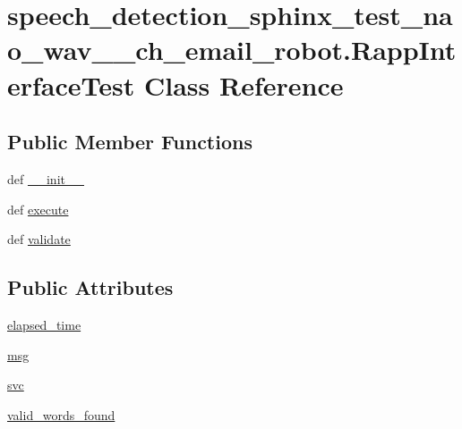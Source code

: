 \hypertarget{classspeech__detection__sphinx__test__nao__wav__1__ch__email__robot_1_1RappInterfaceTest}{\section{speech\-\_\-detection\-\_\-sphinx\-\_\-test\-\_\-nao\-\_\-wav\-\_\-\_\-ch\-\_\-email\-\_\-robot.\-Rapp\-Interface\-Test Class Reference}
\label{classspeech__detection__sphinx__test__nao__wav__1__ch__email__robot_1_1RappInterfaceTest}
}
\subsection*{Public Member Functions}
\begin{DoxyCompactItemize}
\item 
def \hyperlink{classspeech__detection__sphinx__test__nao__wav__1__ch__email__robot_1_1RappInterfaceTest_ae8f82c90ab64bdb06e0ad18dc8aff016}{\-\_\-\-\_\-init\-\_\-\-\_\-}
\item 
def \hyperlink{classspeech__detection__sphinx__test__nao__wav__1__ch__email__robot_1_1RappInterfaceTest_a176c455f0872a03c085e0b27ed47ec56}{execute}
\item 
def \hyperlink{classspeech__detection__sphinx__test__nao__wav__1__ch__email__robot_1_1RappInterfaceTest_aa3d4d30da860ac5eb8a98355e13b757b}{validate}
\end{DoxyCompactItemize}
\subsection*{Public Attributes}
\begin{DoxyCompactItemize}
\item 
\hyperlink{classspeech__detection__sphinx__test__nao__wav__1__ch__email__robot_1_1RappInterfaceTest_a306c66ca9da9703a83a2f42de67ff42c}{elapsed\-\_\-time}
\item 
\hyperlink{classspeech__detection__sphinx__test__nao__wav__1__ch__email__robot_1_1RappInterfaceTest_a2d9308a4c32d42af85bd32b942c6a21b}{msg}
\item 
\hyperlink{classspeech__detection__sphinx__test__nao__wav__1__ch__email__robot_1_1RappInterfaceTest_aba79116cfcb1cd0e1c7f7da5c518270e}{svc}
\item 
\hyperlink{classspeech__detection__sphinx__test__nao__wav__1__ch__email__robot_1_1RappInterfaceTest_abec6927bb982a13f7e41461658b8c32c}{valid\-\_\-words\-\_\-found}
\end{DoxyCompactItemize}


